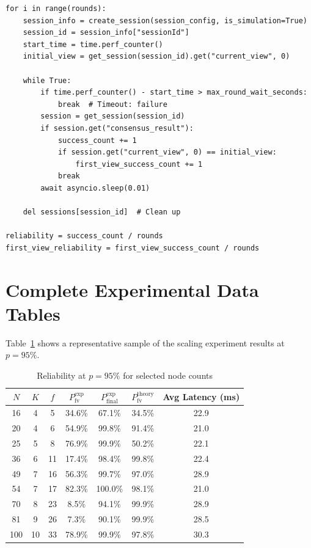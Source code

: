 \documentclass[
12pt,
oneside,
singlespacing,
parskip,
]{article}
\begin{document}
\begin{lstlisting}[caption={Monte Carlo outer loop (\texttt{main.py})}, label=lst:montecarlo]
for i in range(rounds):
    session_info = create_session(session_config, is_simulation=True)
    session_id = session_info["sessionId"]
    start_time = time.perf_counter()
    initial_view = get_session(session_id).get("current_view", 0)

    while True:
        if time.perf_counter() - start_time > max_round_wait_seconds:
            break  # Timeout: failure
        session = get_session(session_id)
        if session.get("consensus_result"):
            success_count += 1
            if session.get("current_view", 0) == initial_view:
                first_view_success_count += 1
            break
        await asyncio.sleep(0.01)

    del sessions[session_id]  # Clean up

reliability = success_count / rounds
first_view_reliability = first_view_success_count / rounds
\end{lstlisting}

\section{Complete Experimental Data Tables}
\label{app:data}

Table~\ref{tab:scaling_sample} shows a representative sample of the scaling experiment results at $p = 95\%$.

\begin{table}[H]
\centering
\caption{Reliability at $p = 95\%$ for selected node counts}
\label{tab:scaling_sample}
\begin{tabular}{ccccccc}
\toprule
$N$ & $K$ & $f$ & $P_\mathrm{fv}^\mathrm{exp}$ & $P_\mathrm{final}^\mathrm{exp}$ & $P_\mathrm{fv}^\mathrm{theory}$ & Avg Latency (ms) \\
\midrule
16  & 4 & 5  & 34.6\% & 67.1\%  & 34.5\% & 22.9 \\
20  & 4 & 6  & 54.9\% & 99.8\%  & 91.4\% & 21.0 \\
25  & 5 & 8  & 76.9\% & 99.9\%  & 50.2\% & 22.1 \\
36  & 6 & 11 & 17.4\% & 98.4\%  & 99.8\% & 22.4 \\
49  & 7 & 16 & 56.3\% & 99.7\%  & 97.0\% & 28.9 \\
54  & 7 & 17 & 82.3\% & 100.0\% & 98.1\% & 21.0 \\
70  & 8 & 23 &  8.5\% & 94.1\%  & 99.9\% & 28.9 \\
81  & 9 & 26 &  7.3\% & 90.1\%  & 99.9\% & 28.5 \\
100 & 10 & 33 & 78.9\% & 99.9\%  & 97.8\% & 30.3 \\
\bottomrule
\end{tabular}
\end{table}
\end{document}
